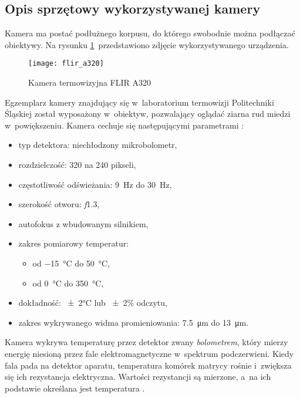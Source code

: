 \subsection{Opis sprzętowy wykorzystywanej kamery}
Kamera ma postać podłużnego korpusu, do którego swobodnie można podłączać
obiektywy.
Na rysunku \ref{fig:camera}~przedstawiono zdjęcie wykorzystywanego urządzenia.
\begin{figure}[htb]
    \centering
    \texttt{[image: flir\_a320]}
    \caption{Kamera termowizyjna FLIR A320 \cite{flir_camera_specs}}
    \label{fig:camera}
\end{figure}
Egzemplarz kamery znajdujący się w~laboratorium termowizji Politechniki Śląskiej 
został wyposażony w~obiektyw, pozwalający oglądać ziarna rud miedzi
w~powiększeniu.
Kamera cechuje się następującymi parametrami \cite{flir_camera_specs}:
\begin{itemize}
    \item typ detektora: niechłodzony mikrobolometr,
    \item rozdzielczość: 320 na 240 pikseli,
    \item częstotliwość odświeżania: \SI{9}{\hertz} do \SI{30}{\hertz},
    \item szerokość otworu: \textit{f}\num{1,3},
    \item autofokus z wbudowanym silnikiem,
    \item zakres pomiarowy temperatur:
          \begin{itemize}[label={$\diamond$}]
              \item od \SI{-15}{\celsius} do \SI{+50}{\celsius},
              \item od \SI{0}{\celsius} do \SI{350}{\celsius},
          \end{itemize}
    \item dokładność: \num{\pm2}\si{\celsius} lub \num{\pm2}\% odczytu,
    \item zakres wykrywanego widma promieniowania: \SI{7,5}{\micro\meter}
          do \SI{13}{\micro\meter}.
\end{itemize}

Kamera wykrywa temperaturę przez detektor zwany \emph{bolometrem}, który mierzy
energię niesioną przez fale elektromagnetyczne w~spektrum podczerwieni.
Kiedy fala pada na detektor aparatu, temperatura komórek matrycy rośnie
i~zwiększa się ich rezystancja elektryczna.
Wartości rezystancji są mierzone, a~na ich podstawie określana jest temperatura
\cite{vanhoof_infrared}.

